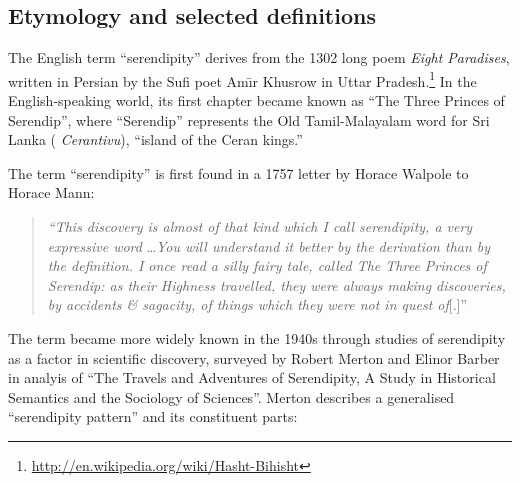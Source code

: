 
\subsection{Etymology and selected definitions} \label{sec:overview-serendipity}  \label{sec:literature-review}
The English term ``serendipity'' derives from the 1302 long poem \emph{Eight Paradises}, written in Persian by the Sufi poet Am\={\i}r Khusrow in Uttar Pradesh.\footnote{\url{http://en.wikipedia.org/wiki/Hasht-Bihisht}}  In the English-speaking world, its first chapter became known as ``The Three Princes of Serendip'', where ``Serendip'' represents the Old Tamil-Malayalam word for Sri Lanka (%
\emph{Cerantivu}), ``island of the Ceran kings.''

The term ``serendipity'' is first found in a 1757 letter by Horace Walpole to Horace Mann:
\begin{quote}
\emph{``This discovery is almost of that kind which I call serendipity, a very expressive
word} \ldots \emph{You will understand it better by the derivation than by the
definition. I once read a silly fairy tale, called The Three Princes of Serendip:
as their Highness travelled, they were always making discoveries, by accidents
\& sagacity, of things which they were not in quest of}[.]''~\cite[p. 633]{van1994anatomy}
\end{quote}
The term became more widely known in the 1940s through studies of serendipity as a factor in scientific discovery, surveyed by Robert Merton and Elinor Barber \citeyear{merton} in analyis of ``The Travels and Adventures of Serendipity, A Study in Historical Semantics and the Sociology of Sciences''.  Merton \citeyear{merton1948bearing} \cite<cited in>[pp. 195--196]{merton} describes a generalised ``serendipity pattern'' and its constituent parts:

